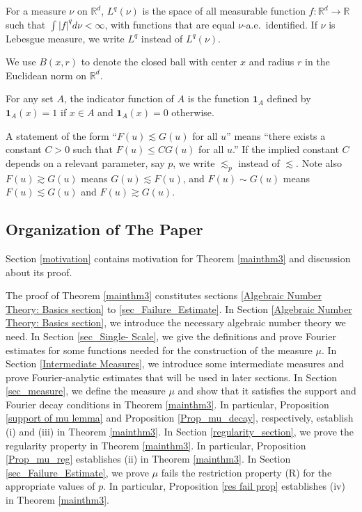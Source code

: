 \documentclass{amsart}
\numberwithin{equation}{section}
\theoremstyle{definition}
\theoremstyle{definition}
\def\RR{\mathbb{R}}
\def\one{\mathbf{1}}
\begin{document}
For a measure $\nu$ on $\RR^d$, $L^q(\nu)$ is the space of all measurable function $f:\RR^d \to \RR$ such that $\int |f|^q d\nu < \infty$, with functions that are equal $\nu$-a.e.\ identified.
If $\nu$ is Lebesgue measure, we write $L^q$ instead of $L^q(\nu)$.

We use $B(x,r)$  to denote the closed ball with center $x$ and radius $r$ in the Euclidean norm on $\RR^d$. 


For any set $A$, the indicator function of $A$ is the function $\one_A$  defined by $\one_A(x) = 1$ if $x \in A$ and $\one_A(x) = 0$ otherwise. 

A statement of the form ``$F(u) \lesssim G(u)$ for all $u$'' means ``there exists a constant $C>0$ such that $F(u) \leq C G(u)$ for all $u$.'' If the implied constant $C$ depends on a relevant parameter, say $p$, we write $\lesssim_{p}$ instead of $\lesssim$. 
Note also 
$F(u)  \gtrsim G(u)$ means $G(u) \lesssim F(u)$,   
and 
$F(u) \sim G(u)$ means $F(u) \lesssim G(u)$ and $F(u) \gtrsim  G(u)$.


\subsection{Organization of The Paper}\label{organization}

Section \ref{motivation} contains motivation for Theorem \ref{mainthm3} and discussion about its proof. 

The proof of Theorem \ref{mainthm3} constitutes sections \ref{Algebraic Number Theory: Basics section} to \ref{sec_Failure_Estimate}.
In Section \ref{Algebraic Number Theory: Basics section}, we introduce the necessary algebraic number theory we need. 
In Section \ref{sec_Single-
Scale}, we give the definitions and prove Fourier estimates for some functions needed for the construction of the measure $\mu$. 
In Section \ref{Intermediate Measures}, we introduce some intermediate measures and prove Fourier-analytic estimates  that will be used in later sections. 
In Section \ref{sec_measure}, we define the measure $\mu$ and show that it satisfies the support and Fourier decay conditions in Theorem \ref{mainthm3}. In particular,  
Proposition \ref{support of mu lemma} and Proposition \ref{Prop_mu_decay}, respectively,  establish (i) and (iii) in Theorem \ref{mainthm3}. 
In Section \ref{regularity_section}, we prove the regularity property in Theorem \ref{mainthm3}. In particular, Proposition \ref{Prop_mu_reg} establishes (ii) in Theorem \ref{mainthm3}.  
In Section \ref{sec_Failure_Estimate}, we prove $\mu$ fails the restriction property (R) for the appropriate values of $p$. In particular,  Proposition \ref{res fail prop} establishes (iv) in Theorem \ref{mainthm3}. 
\end{document}
